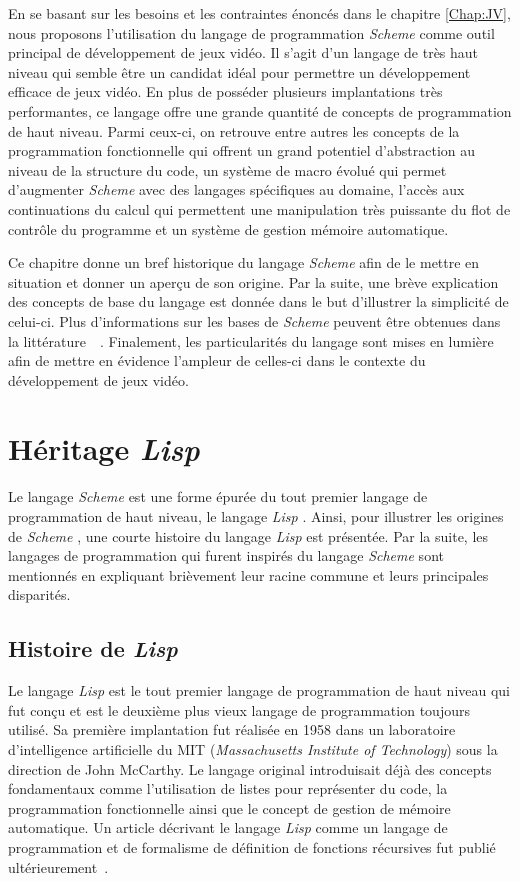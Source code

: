 \documentclass[12pt,twoside,letterpaper,francais]{book}
\newcommand{\lisp}{{\textit{Lisp }}}
\newcommand{\Schemelang}{{\textit{Scheme }}}
\begin{document}
En se basant sur les besoins et les contraintes énoncés dans le
chapitre \ref{Chap:JV}, nous proposons l'utilisation du langage de
programmation \Schemelang comme outil principal de développement de
jeux vidéo. Il s'agit d'un langage de très haut niveau qui semble être
un candidat idéal pour permettre un développement efficace de jeux
vidéo. En plus de posséder plusieurs implantations très performantes,
ce langage offre une grande quantité de concepts de programmation de
haut niveau. Parmi ceux-ci, on retrouve entre autres les concepts de
la programmation fonctionnelle qui offrent un grand potentiel
d'abstraction au niveau de la structure du code, un système de macro
évolué qui permet d'augmenter \Schemelang avec des langages
spécifiques au domaine, l'accès aux continuations du calcul qui
permettent une manipulation très puissante du flot de contrôle du
programme et un système de gestion mémoire automatique.

Ce chapitre donne un bref historique du langage \Schemelang afin de le
mettre en situation et donner un aperçu de son origine. Par la suite,
une brève explication des concepts de base du langage est donnée dans
le but d'illustrer la simplicité de celui-ci. Plus d'informations sur
les bases de \Schemelang peuvent être obtenues dans la
littérature~\cite{R5RS}~\cite{SICP}. Finalement, les particularités du
langage sont mises en lumière afin de mettre en évidence l'ampleur de
celles-ci dans le contexte du développement de jeux vidéo.


\FloatBarrier
\section{Héritage \lisp} \label{Scheme:hist}
Le langage \Schemelang est une forme épurée du tout premier langage de
programmation de haut niveau, le langage \lisp. Ainsi, pour illustrer
les origines de \Schemelang, une courte histoire du langage \lisp est
présentée. Par la suite, les langages de programmation qui furent
inspirés du langage \Schemelang sont mentionnés en expliquant
brièvement leur racine commune et leurs principales disparités.


\FloatBarrier
\subsection{Histoire de \lisp}
Le langage \lisp est le tout premier langage de programmation de haut
niveau qui fut conçu et est le deuxième plus vieux langage de
programmation toujours utilisé. Sa première implantation fut réalisée
en 1958 dans un laboratoire d'intelligence artificielle du MIT
(\textit{Massachusetts Institute of Technology}) sous la direction de
John McCarthy. Le langage original introduisait déjà des concepts
fondamentaux comme l'utilisation de listes pour représenter du code,
la programmation fonctionnelle ainsi que le concept de gestion de
mémoire automatique. Un article décrivant le langage \lisp comme un
langage de programmation et de formalisme de définition de fonctions
récursives fut publié ultérieurement~\cite{LISP_ORIGINS}.
\end{document}
